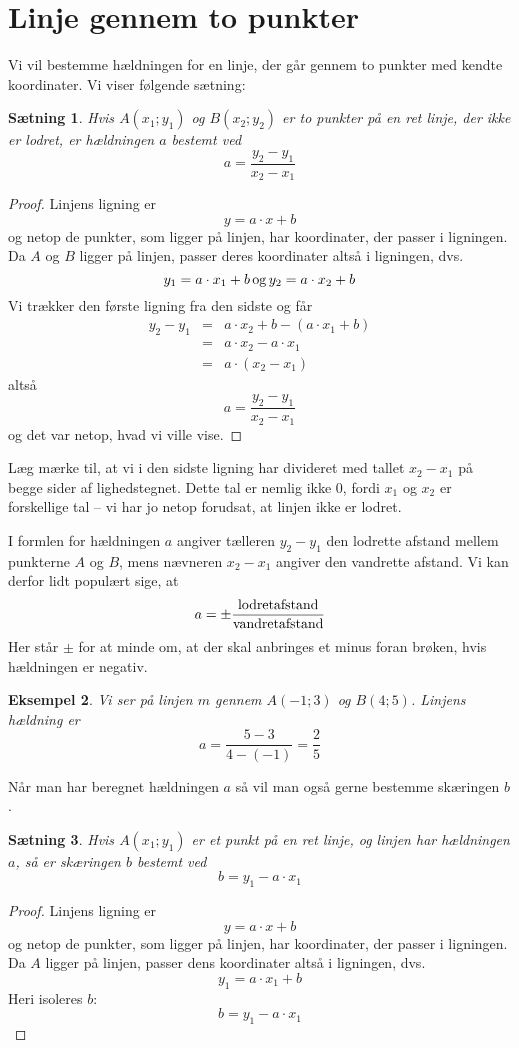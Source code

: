 \documentclass[12pt,oneside,a4paper]{article}
\newcommand{\bas}{\begin{eqnarray*}}
\newcommand{\eas}{\end{eqnarray*}}
\newtheorem{thm}{Sætning}[section]
\newtheorem{eks}[thm]{Eksempel}
\begin{document}
\section{Linje gennem to punkter}
Vi vil bestemme hældningen for en linje, der går gennem
to punkter med kendte koordinater. Vi viser følgende sætning:
\begin{thm}
    Hvis $A(x_1; y_1)$ og $B(x_2; y_2)$ er to punkter på en ret linje, der ikke
    er lodret, er hældningen $a$ bestemt ved
    $$
    a = \frac{y_2-y_1}{x_2-x_1}
    $$
\end{thm}
\begin{proof}
    Linjens ligning er 
    $$
    y = a\cdot x + b
    $$
    og netop de punkter, som ligger på linjen, har koordinater, der passer i
    ligningen.  Da $A$ og $B$ ligger på linjen, passer deres koordinater altså
    i ligningen, dvs.
    $$
    y_1 = a\cdot x_1 + b \, {\rm og} \, y_2 = a\cdot x_2 + b 
    $$
    Vi trækker den første ligning fra den sidste og får
    \bas
    y_2 - y_1 &=& a\cdot x_2 + b - (a\cdot x_1 + b) \\
              &=& a\cdot x_2 - a\cdot x_1 \\
              &=& a\cdot \left(x_2-x_1\right) 
    \eas
    altså
    $$
    a = \frac{y_2-y_1}{x_2-x_1}
    $$
    og det var netop, hvad vi ville vise.
\end{proof}

Læg mærke til, at vi i den sidste ligning har divideret med tallet $x_2-x_1$ på
begge sider af lighedstegnet. Dette tal er nemlig ikke $0$, fordi $x_1$ og
$x_2$ er forskellige tal -- vi har jo netop forudsat, at linjen ikke er lodret.

I formlen for hældningen $a$ angiver tælleren $y_2-y_1$ den lodrette afstand
mellem punkterne $A$ og $B$, mens nævneren $x_2-x_1$ angiver den vandrette
afstand. Vi kan derfor lidt populært sige, at
$$
a = \pm \frac{\rm lodret afstand}{\rm vandret afstand}
$$
Her står $\pm$ for at minde om, at der skal anbringes et minus foran brøken,
hvis hældningen er negativ.
\begin{eks}
    Vi ser på linjen $m$ gennem $A(-1; 3)$ og $B(4; 5)$.
    Linjens hældning er
    $$
    a = \frac{5-3}{4-(-1)} = \frac{2}{5}
    $$
\end{eks}

Når man har beregnet hældningen $a$ så vil man også gerne bestemme skæringen
$b$.
\begin{thm}
    Hvis $A(x_1; y_1)$ er et punkt på en ret linje, og linjen har hældningen
    $a$, så er skæringen $b$ bestemt ved
    $$
    b = y_1 - a\cdot x_1
    $$
\end{thm}
\begin{proof}
    Linjens ligning er 
    $$
    y = a\cdot x + b
    $$
    og netop de punkter, som ligger på linjen, har koordinater, der passer i
    ligningen.  Da $A$ ligger på linjen, passer dens koordinater altså i
    ligningen, dvs.
    $$
    y_1 = a\cdot x_1 + b 
    $$
    Heri isoleres $b$:
    $$
    b = y_1 - a\cdot x_1
    $$
\end{proof}
\end{document}
